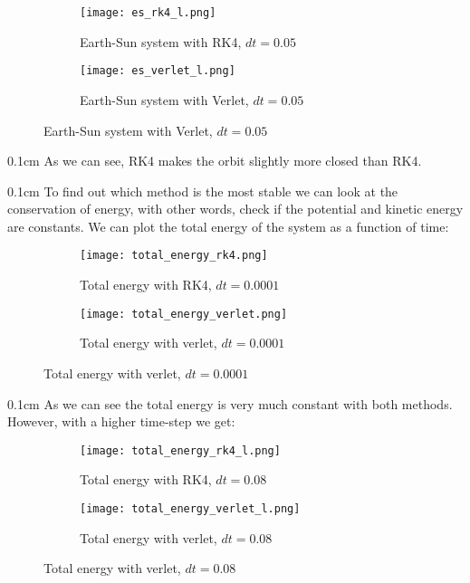 \documentclass[11 pt, a4 paper]{article}
\newenvironment{tabbed}{\begin{addmargin}{0.1cm}}{\end{addmargin}}
\newcommand{\vsp}{\vspace{0.2cm}}
\begin{document}
        \begin{figure}[H]
            \captionsetup[subfigure]{labelformat=empty}
            \begin{subfigure}[b!]{0.6\textwidth}
                \centering
                \texttt{[image: es\_rk4\_l.png]}
                \caption{Earth-Sun system with RK4, $dt=0.05$}
            \end{subfigure}
            \begin{subfigure}[b!]{0.6\textwidth}
                \texttt{[image: es\_verlet\_l.png]}
                \caption{Earth-Sun system with Verlet, $dt=0.05$}
            \end{subfigure}
        \end{figure}
    \begin{tabbed}
        As we can see, RK4 makes the orbit slightly more closed than RK4.
    \end{tabbed}\vsp
    \begin{tabbed}
        To find out which method is the most stable we can look at the conservation of energy, with other words, check if the potential and kinetic energy are constants. We can plot the total energy of the system as a function of time:
        \begin{figure}[H]
            \captionsetup[subfigure]{labelformat=empty}
            \begin{subfigure}[b!]{0.6\textwidth}
                \centering
                \texttt{[image: total\_energy\_rk4.png]}
                \caption{Total energy with RK4, $dt=0.0001$}
            \end{subfigure}
            \begin{subfigure}[b!]{0.6\textwidth}
                \texttt{[image: total\_energy\_verlet.png]}
                \caption{Total energy with verlet, $dt=0.0001$}
            \end{subfigure}
        \end{figure}
    \end{tabbed}
    \begin{tabbed}
        As we can see the total energy is very much constant with both methods. However, with a higher time-step we get:
        \begin{figure}[H]
            \captionsetup[subfigure]{labelformat=empty}
            \begin{subfigure}[b!]{0.6\textwidth}
                \centering
                \texttt{[image: total\_energy\_rk4\_l.png]}
                \caption{Total energy with RK4, $dt=0.08$}
            \end{subfigure}
            \begin{subfigure}[b!]{0.6\textwidth}
                \texttt{[image: total\_energy\_verlet\_l.png]}
                \caption{Total energy with verlet, $dt=0.08$}
            \end{subfigure}
        \end{figure}
    \end{tabbed}
\end{document}
